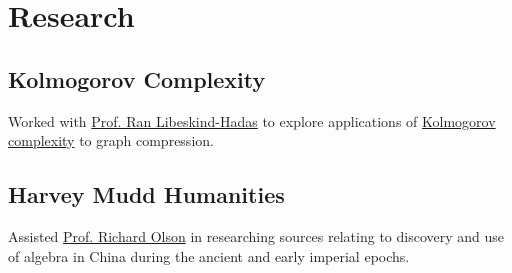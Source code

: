 \documentclass[]{jhearn-resume}
\begin{document}
\begin{minipage}[t]{0.34\textwidth}
\section{Research}
\subsection{Kolmogorov Complexity}
\small Worked with 
{\href{https://www.cs.hmc.edu/~hadas/}{\color{blue1}Prof. Ran Libeskind-Hadas}} 
to explore applications of 
{\href{https://en.wikipedia.org/wiki/Kolmogorov_complexity}{\color{blue1}Kolmogorov complexity}} 
to graph compression.
\sectionsep 

\subsection{Harvey Mudd Humanities}
\small Assisted {\href{https://www.hmc.edu/hsa/hsa-faculty/emeritus-faculty/richard-olson/}{\color{blue1}Prof. Richard Olson}} in researching sources relating to discovery and use of algebra in China during the ancient and early imperial epochs.
\sectionsep

\end{minipage}
\end{document}
